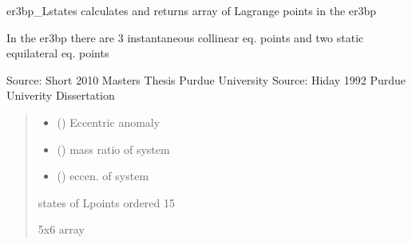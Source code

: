 \documentclass[letterpaper,10pt,english]{sphinxmanual}
\begin{document}

\begin{fulllineitems}
\label{\detokenize{models:pyraa.models.er3bp_Lstates}}
\pysigstartsignatures
{}
\pysigstopsignatures
\sphinxAtStartPar
er3bp\_Lstates \sphinxhyphen{} calculates and returns array of Lagrange points in the er3bp

\sphinxAtStartPar
In the er3bp there are 3 instantaneous collinear eq. points and two static
equilateral eq. points

\sphinxAtStartPar
Source: Short 2010 Master\textquotesingle{}s Thesis Purdue University
Source: Hiday 1992 Purdue Univerity Dissertation
\begin{quote}\begin{description}
\begin{itemize}
\item {} 
\sphinxAtStartPar
{} () \sphinxhyphen{}\sphinxhyphen{} Eccentric anomaly

\item {} 
\sphinxAtStartPar
{} () \sphinxhyphen{}\sphinxhyphen{} mass ratio of system

\item {} 
\sphinxAtStartPar
{} () \sphinxhyphen{}\sphinxhyphen{} eccen. of system

\end{itemize}

\sphinxAtStartPar
{} \sphinxhyphen{}\sphinxhyphen{} states of Lpoints ordered 1\sphinxhyphen{}5

\sphinxAtStartPar
5x6 array

\end{description}\end{quote}

\end{fulllineitems}
\end{document}
